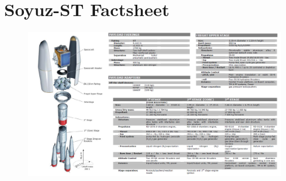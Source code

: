\documentclass[11pt]{report}
\begin{document}
\chapter{Soyuz-ST Factsheet}
\label{appa}
\newpage
\begin{figure}[ht]
\centering
\includegraphics[width=1.0\textwidth, angle=0]{chapters/img/soyuzfact.png}
\label{fig:soyuzfact}

\end{figure}

\newpage


\newpage

\end{document}

